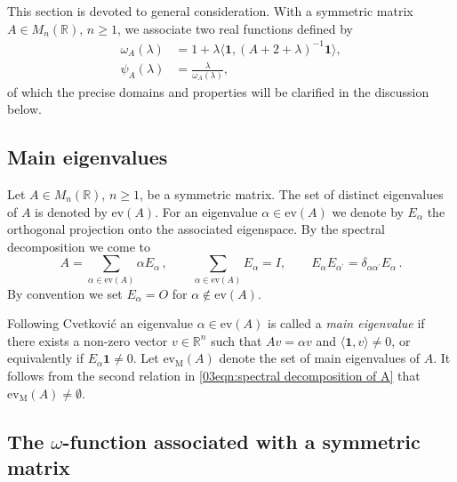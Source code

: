 \documentclass[12pt,a4paper]{article}
\newcommand{\1}{{\bm 1}}
\numberwithin{equation}{section}
\begin{document}
This section is devoted to general consideration.
With a symmetric matrix $A\in M_n(\mathbb{R})$, $n\ge1$, we
associate two real functions defined by
%
\begin{align}
\omega_A(\lambda)
&= 1+\lambda \langle\mathbf{1},(A+2+\lambda)^{-1}\mathbf{1}\rangle,
\label{03eqn:def of omega(lambda)}
\\[6pt]
\psi_A(\lambda)
&=\frac{\lambda}{\omega_A(\lambda)},
\label{03eqn:def of psi(lambda) original}
\end{align}
%
of which the precise domains and properties 
will be clarified in the discussion below.


\subsection{Main eigenvalues}
\label{03sec:Main eigenvalues}


Let $A\in M_n(\mathbb{R})$, $n\ge1$, be a symmetric matrix.
The set of distinct eigenvalues of $A$ is denoted by $\mathrm{ev}(A)$.
For an eigenvalue $\alpha\in\mathrm{ev}(A)$ we denote by
$E_\alpha$ the orthogonal projection onto the 
associated eigenspace.
By the spectral decomposition we come to
%
\begin{equation}\label{03eqn:spectral decomposition of A}
A=\sum_{\alpha\in\mathrm{ev}(A)} \alpha E_\alpha\,,
\qquad
\sum_{\alpha\in\mathrm{ev}(A)}E_\alpha =I,
\qquad
E_\alpha E_{\alpha^\prime}=\delta_{\alpha\alpha^\prime} E_\alpha\,.
\end{equation}
%
By convention we set $E_\alpha=O$ for $\alpha\not\in\mathrm{ev}(A)$.

Following Cvetkovi\'c \cite{Cvetkovic1978,Cvetkovic-Rowlinson-Simic2010}
an eigenvalue $\alpha\in\mathrm{ev}(A)$ is called
a \textit{main eigenvalue} if
there exists a non-zero vector $v\in \mathbb{R}^n$ such that
$Av=\alpha v$ and $\langle \mathbf{1}, v\rangle\neq0$,
or equivalently if $E_\alpha\mathbf{1}\neq0$.
Let $\mathrm{ev}_{\mathrm{M}}(A)$ denote the set of main eigenvalues of $A$.
It follows from the second relation in
\eqref{03eqn:spectral decomposition of A} that
$\mathrm{ev}_{\mathrm{M}}(A)\neq\emptyset$.

\subsection{The $\omega$-function associated with a symmetric matrix}
\end{document}
